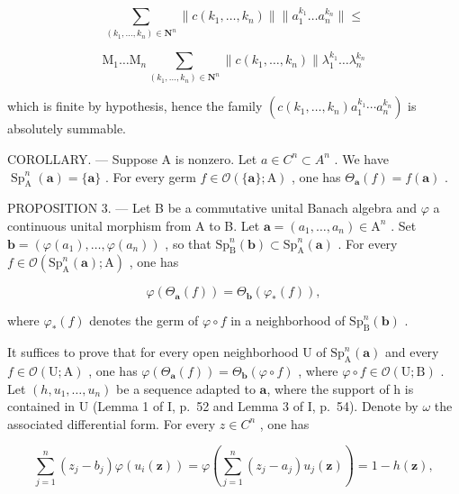 \[
\sum_ {(k _ {1}, \dots , k _ {n}) \in \mathbf {N} ^ {n}} \| c (k _ {1}, \dots , k _ {n}) \| \| a _ {1} ^ {k _ {1}} \dots a _ {n} ^ {k _ {n}} \| \leqslant
\]

\[
\mathrm{M} _ {1} \dots \mathrm{M} _ {n} \sum_ {(k _ {1}, \dots , k _ {n}) \in \mathbf {N} ^ {n}} \| c (k _ {1}, \dots , k _ {n}) \| \lambda_ {1} ^ {k _ {1}} \dots \lambda_ {n} ^ {k _ {n}}
\]

which is finite by hypothesis, hence the family \((c(k_{1},\ldots,k_{n})a_{1}^{k_{1}}\cdots a_{n}^{k_{n}})\) is absolutely summable.

COROLLARY. --- Suppose A is nonzero. Let \(a \in C^{n} \subset A^{n}\) . We have \(\operatorname{Sp}_{\mathrm{A}}^{n}(\boldsymbol{a}) = \{\boldsymbol{a}\}\) . For every germ \(f \in \mathcal{O}(\{\boldsymbol{a}\}; \mathrm{A})\) , one has \(\Theta_{\boldsymbol{a}}(f) = f(\boldsymbol{a})\) .

PROPOSITION 3. --- Let B be a commutative unital Banach algebra and \(\varphi\) a continuous unital morphism from A to B. Let \(\boldsymbol{a} = (a_1, \ldots, a_n) \in \mathrm{A}^n\) . Set \(\boldsymbol{b} = (\varphi(a_1), \ldots, \varphi(a_n))\) , so that \(\mathrm{Sp}_{\mathrm{B}}^{n}(\boldsymbol{b}) \subset \mathrm{Sp}_{\mathrm{A}}^{n}(\boldsymbol{a})\) . For every \(f \in \mathcal{O}(\mathrm{Sp}_{\mathrm{A}}^{n}(\boldsymbol{a}); \mathrm{A})\) , one has

\[
\varphi (\Theta_ {\boldsymbol {a}} (f)) = \Theta_ {\boldsymbol {b}} (\varphi_ {*} (f)),
\]

where \(\varphi_{*}(f)\) denotes the germ of \(\varphi \circ f\) in a neighborhood of \(\mathrm{Sp}_{\mathrm{B}}^{n}(\boldsymbol{b})\) .

It suffices to prove that for every open neighborhood U of \(\mathrm{Sp}_{\mathrm{A}}^{n}(\boldsymbol{a})\) and every \(f \in \mathcal{O}(\mathrm{U}; \mathrm{A})\) , one has \(\varphi(\Theta_{\boldsymbol{a}}(f)) = \Theta_{\boldsymbol{b}}(\varphi \circ f)\) , where \(\varphi \circ f \in \mathcal{O}(\mathrm{U}; \mathrm{B})\) . Let \((h, u_{1}, \ldots, u_{n})\) be a sequence adapted to \(\boldsymbol{a}\), where the support of h is contained in U (Lemma 1 of I, p.~52 and Lemma 3 of I, p.~54). Denote by \(\omega\) the associated differential form. For every \(z \in C^{n}\) , one has

\[
\sum_ {j = 1} ^ {n} (z _ {j} - b _ {j}) \varphi (u _ {i} (\boldsymbol {z})) = \varphi \left(\sum_ {j = 1} ^ {n} (z _ {j} - a _ {j}) u _ {j} (\boldsymbol {z})\right) = 1 - h (\boldsymbol {z}),
\]

